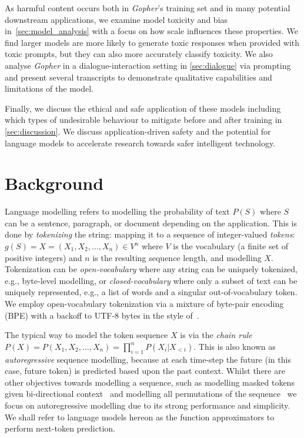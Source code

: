 \documentclass[11pt, a4paper, logo, internal, copyright, nonumbering]{deepmind}
\newcommand{\gopher}{\textit{Gopher}\xspace}
\begin{document}
As harmful content occurs both in \gopher's training set and in many potential downstream applications, we examine model toxicity and bias in~\autoref{sec:model_analysis} with a focus on how scale influences these properties. We find larger models are more likely to generate toxic responses when provided with toxic prompts, but they can also more accurately classify toxicity. 
We also analyse \gopher in a dialogue-interaction setting in \autoref{sec:dialogue} via prompting and present several transcripts to demonstrate qualitative capabilities and limitations of the model.

Finally, we discuss the ethical and safe application of these models including which types of undesirable behaviour to mitigate before and after training in \autoref{sec:discussion}. We discuss application-driven safety and the potential for language models to accelerate research towards safer intelligent technology.

\section{Background}
\label{background}
Language modelling refers to modelling the probability of text $P(S)$ where $S$ can be a sentence, paragraph, or document depending on the application. This is done by \textit{tokenizing} the string: mapping it to a sequence of integer-valued \textit{tokens}: $g(S) = X = (X_1, X_2, \ldots, X_n) \in V^n$ where $V$ is the vocabulary (a finite set of positive integers) and $n$ is the resulting sequence length, and modelling $X$. Tokenization can be \textit{open-vocabulary} where any string can be uniquely tokenized, e.g., byte-level modelling, or \textit{closed-vocabulary} where only a subset of text can be uniquely represented, e.g., a list of words and a singular out-of-vocabulary token. We employ open-vocabulary tokenization via a mixture of byte-pair encoding (BPE) with a backoff to UTF-8 bytes in the style of~\citet{radford2018improving}. 

The typical way to model the token sequence $X$ is via the \textit{chain rule} $P(X) = P(X_1, X_2, \ldots, X_n) = \prod_{i=1}^n P(X_i | X_{<i})$. This is also known as \textit{autoregressive} sequence modelling, because at each time-step the future (in this case, future token) is predicted based upon the past context. Whilst there are other objectives towards modelling a sequence, such as modelling masked tokens given bi-directional context~\citep{mikolov2013efficient, devlin2019bert} and modelling all permutations of the sequence~\citep{yang2019xlnet} we focus on autoregressive modelling due to its strong performance and simplicity. We shall refer to language models hereon as the function approximators to perform next-token prediction.
\end{document}
